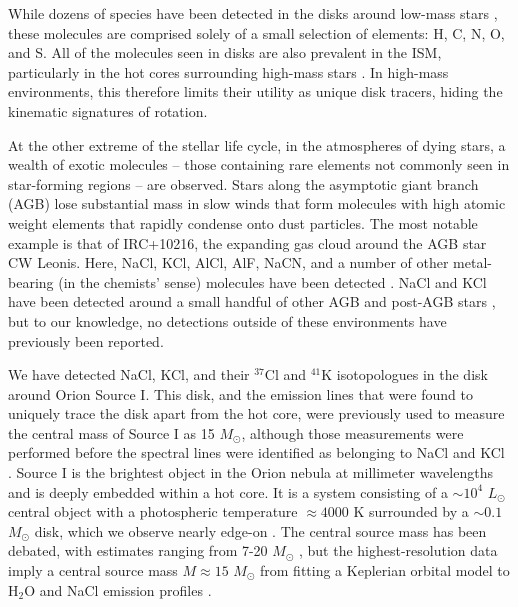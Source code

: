 \documentclass[12pt]{article}
\newcommand{\bam}[1]{\textcolor{green!65!black}{\textbf{[BAM: #1]}}}
\newcommand{\msun}{\ensuremath{M_{\odot}}\xspace}			%
\newcommand{\lsun}{\ensuremath{L_{\odot}}\xspace}			%
\newcommand{\water}{H$_{2}$O\xspace}		%
\begin{document}
While dozens of species have been detected in the disks around low-mass stars
\cite{McGuire2018c}, these molecules are comprised solely of a small selection
of elements: H, C, N, O, and S.  All of the molecules seen in disks are also
prevalent in the ISM, particularly in the hot cores surrounding high-mass stars
\cite{Nummelin1998a,Belloche2013a}. In high-mass environments, this therefore limits
their utility as unique disk tracers, hiding the kinematic
signatures of rotation.

At the other extreme of the stellar life cycle, in the atmospheres of dying
stars, a wealth of exotic molecules -- those containing rare elements not
commonly seen in star-forming regions -- are observed.  Stars along the
asymptotic giant branch (AGB) lose substantial mass in slow winds
\cite{Herwig2005a} that form molecules with high atomic weight elements that
rapidly condense onto dust particles.  The most notable example is that of
IRC+10216, the expanding gas cloud around the AGB star CW Leonis.  Here, NaCl,
KCl, AlCl, AlF, NaCN, and a number of other metal-bearing (in the chemists'
sense) molecules have been detected \cite{Agundez2012a,Zack2011a}.  NaCl and
KCl have been detected around a
small handful of other AGB and post-AGB stars
\cite{Milam2007a,Highberger2003a,Sanchez-Contreras2018a}, but to our knowledge,
no detections outside of these environments have previously been reported.

We have detected NaCl, KCl, and their $^{37}$Cl and $^{41}$K isotopologues in
the disk around Orion Source I.  This disk, and the emission lines that were
found to uniquely trace the disk apart from the hot core, were previously used
to measure the central mass of Source I as 15 \msun, although those
measurements were performed before the spectral lines were identified as
belonging to NaCl and KCl
 \cite{Ginsburg2018b}.  Source I is the brightest object in the
Orion nebula at millimeter wavelengths and is deeply embedded within a hot
core.  It is a system consisting of a $\sim10^4$ \lsun central object with a
photospheric temperature $\approx4000$ K \cite{Testi2010a} surrounded by a
$\sim0.1$ \msun disk, which we observe nearly edge-on \cite{Plambeck2016a}. The
central source mass has been debated, with estimates ranging from 7-20 \msun
\cite{Matthews2010a,Plambeck2016a}, but the highest-resolution data imply a central
source mass $M\approx15$ \msun from fitting a Keplerian orbital model to \water
and NaCl emission profiles \cite{Ginsburg2018b}.

\end{document}

